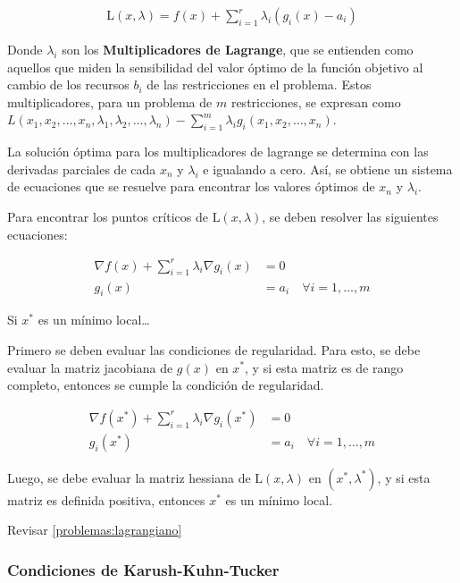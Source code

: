\documentclass{article}
\begin{document}
\begin{align*}
    \mathrm{L}(x, \lambda) = f(x) + \sum_{i=1}^r \lambda_i (g_i(x) - a_i)
\end{align*}

Donde $\lambda_i$ son los \textbf{Multiplicadores de Lagrange}, que se entienden como aquellos que miden la sensibilidad del valor óptimo de la función objetivo al cambio de los recursos $b_i$ de las restricciones en el problema. Estos multiplicadores, para un problema de $m$ restricciones, se expresan como $L(x_1, x_2, \dots, x_n, \lambda_1, \lambda_2, \dots, \lambda_n) - \sum_{i=1}^{m} \lambda_i g_i(x_1,x_2,\dots,x_n)$.

La solución óptima para los multiplicadores de lagrange se determina con las derivadas parciales de cada $x_n$ y $\lambda_i$ e igualando a cero. Así, se obtiene un sistema de ecuaciones que se resuelve para encontrar los valores óptimos de $x_n$ y $\lambda_i$.

Para encontrar los puntos críticos de $\mathrm{L}(x, \lambda)$, se deben resolver las siguientes ecuaciones:

\begin{align*}
    \nabla f(x) + \sum_{i=1}^r \lambda_i \nabla g_i(x) & = 0                                  \\
    g_i(x)                                             & = a_i \quad \forall i = 1, \ldots, m
\end{align*}

Si $x^*$ es un mínimo local\dots


Primero se deben evaluar las condiciones de regularidad. Para esto, se debe evaluar la matriz jacobiana de $g(x)$ en $x^*$, y si esta matriz es de rango completo, entonces se cumple la condición de regularidad.

\begin{align*}
    \nabla f(x^*) + \sum_{i=1}^r \lambda_i \nabla g_i(x^*) & = 0                                  \\
    g_i(x^*)                                               & = a_i \quad \forall i = 1, \ldots, m
\end{align*}

Luego, se debe evaluar la matriz hessiana de $\mathrm{L}(x, \lambda)$ en $(x^*, \lambda^*)$, y si esta matriz es definida positiva, entonces $x^*$ es un mínimo local.

Revisar \ref{problemas:lagrangiano}

\subsubsection{Condiciones de Karush-Kuhn-Tucker}
\end{document}
